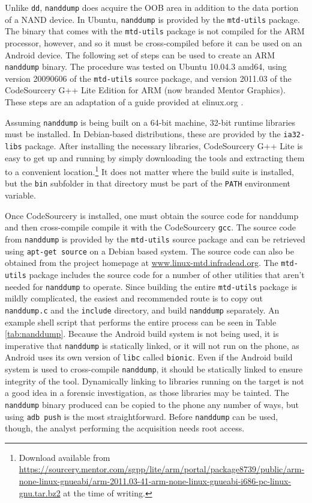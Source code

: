 Unlike \texttt{dd}, \texttt{nanddump} does acquire the OOB area in addition to the data portion of a NAND device.  In Ubuntu,
\texttt{nanddump} is provided by the \texttt{mtd-utils} package.  The binary that comes with the \texttt{mtd-utils} package is not
compiled for the ARM processor, however, and so it must be cross-compiled before it can be used on an Android device.  The following
set of steps can be used to create an ARM \texttt{nanddump} binary.  The procedure was tested on Ubuntu 10.04.3 amd64, using version
20090606 of the \texttt{mtd-utils} source package, and version 2011.03 of the CodeSourcery G++ Lite Edition for ARM (now branded
Mentor Graphics).  These steps are an adaptation of a guide provided at elinux.org \cite{compilingmtd}.

Assuming \texttt{nanddump} is being built on a 64-bit machine, 32-bit runtime libraries must be installed.  In Debian-based
distributions, these are provided by the \texttt{ia32-libs} package.  After installing the necessary libraries, CodeSourcery G++ Lite
is easy to get up and running by simply downloading the tools and extracting them to a convenient location.\footnote{Download available
from
\url{https://sourcery.mentor.com/sgpp/lite/arm/portal/package8739/public/arm-none-linux-gnueabi/arm-2011.03-41-arm-none-linux-gnueabi-i686-pc-linux-gnu.tar.bz2}
at the time of writing.} It does not matter where the build suite is installed, but the \texttt{bin} subfolder in that directory
must be part of the \texttt{PATH} environment variable.

Once CodeSourcery is installed, one must obtain the source code for nanddump and then cross-compile compile it with the CodeSourcery
\texttt{gcc}.  The source code from \texttt{nanddump} is provided by the \texttt{mtd-utils} source package and can be retrieved
using \texttt{apt-get source} on a Debian based system.  The source code can also be obtained from the project homepage at
\url{www.linux-mtd.infradead.org}.  The \texttt{mtd-utils} package includes the source code for a number of other utilities that
aren't needed for \texttt{nanddump} to operate.  Since building the entire \texttt{mtd-utils} package is mildly complicated, the
easiest and recommended route is to copy out \texttt{nanddump.c} and the \texttt{include} directory, and build \texttt{nanddump}
separately.  An example shell script that performs the entire process can be seen in Table \ref{tab:nanddump}.  Because the Android
build system is not being used, it is imperative that \texttt{nanddump} is statically linked, or it will not run on the phone, as
Android uses its own version of \texttt{libc} called \texttt{bionic}.  Even if the Android build system is used to cross-compile
\texttt{nanddump}, it should be statically linked to ensure integrity of the tool.  Dynamically linking to libraries running on the
target is not a good idea in a forensic investigation, as those libraries may be tainted.  The \texttt{nanddump} binary produced can
be copied to the phone any number of ways, but using \texttt{adb push} is the most straightforward.  Before \texttt{nanddump} can be
used, though, the analyst performing the acquisition needs root access.

